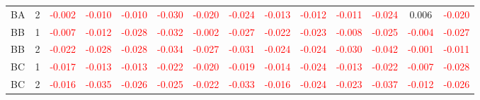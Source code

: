 \begin{table}[H]
{\begin{tabular}{llcccccccccccc}
BA & 2 & \textcolor{red}{-0.002} & \textcolor{red}{-0.010} & \textcolor{red}{-0.010} & \textcolor{red}{-0.030} & \textcolor{red}{-0.020} & \textcolor{red}{-0.024} & \textcolor{red}{-0.013} & \textcolor{red}{-0.012} & \textcolor{red}{-0.011} & \textcolor{red}{-0.024} & 0.006 & \textcolor{red}{-0.020}\\
BB & 1 & \textcolor{red}{-0.007} & \textcolor{red}{-0.012} & \textcolor{red}{-0.028} & \textcolor{red}{-0.032} & \textcolor{red}{-0.002} & \textcolor{red}{-0.027} & \textcolor{red}{-0.022} & \textcolor{red}{-0.023} & \textcolor{red}{-0.008} & \textcolor{red}{-0.025} & \textcolor{red}{-0.004} & \textcolor{red}{-0.027}\\
BB & 2 & \textcolor{red}{-0.022} & \textcolor{red}{-0.028} & \textcolor{red}{-0.028} & \textcolor{red}{-0.034} & \textcolor{red}{-0.027} & \textcolor{red}{-0.031} & \textcolor{red}{-0.024} & \textcolor{red}{-0.024} & \textcolor{red}{-0.030} & \textcolor{red}{-0.042} & \textcolor{red}{-0.001} & \textcolor{red}{-0.011}\\
BC & 1 & \textcolor{red}{-0.017} & \textcolor{red}{-0.013} & \textcolor{red}{-0.013} & \textcolor{red}{-0.022} & \textcolor{red}{-0.020} & \textcolor{red}{-0.019} & \textcolor{red}{-0.014} & \textcolor{red}{-0.024} & \textcolor{red}{-0.013} & \textcolor{red}{-0.022} & \textcolor{red}{-0.007} & \textcolor{red}{-0.028}\\
BC & 2 & \textcolor{red}{-0.016} & \textcolor{red}{-0.035} & \textcolor{red}{-0.026} & \textcolor{red}{-0.025} & \textcolor{red}{-0.022} & \textcolor{red}{-0.033} & \textcolor{red}{-0.016} & \textcolor{red}{-0.024} & \textcolor{red}{-0.023} & \textcolor{red}{-0.037} & \textcolor{red}{-0.012} & \textcolor{red}{-0.026}\\
\hline
    \end{tabular}%
    }
    \label{tab:cen6_cov}
\end{table}

